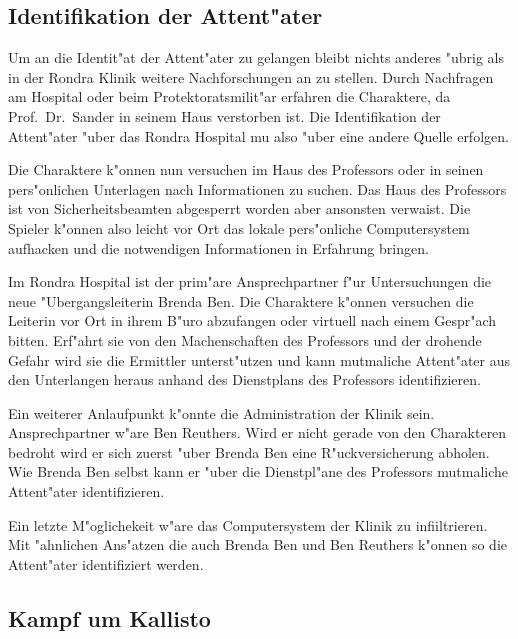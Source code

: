 \subsection{Identifikation der Attent"ater}

 Um an die Identit"at der Attent"ater zu gelangen bleibt nichts anderes "ubrig als in der Rondra Klinik weitere Nachforschungen an zu stellen. Durch Nachfragen am Hospital oder beim Protektoratsmilit"ar erfahren die Charaktere, da\3 Prof.~Dr.~Sander in seinem Haus verstorben ist. Die Identifikation der Attent"ater "uber das Rondra Hospital mu\3 also "uber eine andere Quelle erfolgen.

 Die Charaktere k"onnen nun versuchen im Haus des Professors oder in seinen pers"onlichen Unterlagen nach Informationen zu suchen. Das Haus des Professors ist von Sicherheitsbeamten abgesperrt worden aber ansonsten verwaist. Die Spieler k"onnen also leicht vor Ort das lokale pers"onliche Computersystem aufhacken und die notwendigen Informationen in Erfahrung bringen.

 Im Rondra Hospital ist der prim"are Ansprechpartner f"ur Untersuchungen die neue "Ubergangsleiterin Brenda Ben. Die Charaktere k"onnen versuchen die Leiterin vor Ort in ihrem B"uro abzufangen oder virtuell nach einem Gespr"ach bitten. Erf"ahrt sie von den Machenschaften des Professors und der drohende Gefahr wird sie die Ermittler unterst"utzen und kann mutma\3liche Attent"ater aus den Unterlangen heraus anhand des Dienstplans des Professors identifizieren.

 Ein weiterer Anlaufpunkt k"onnte die Administration der Klinik sein. Ansprechpartner w"are Ben Reuthers. Wird er nicht gerade von den Charakteren bedroht wird er sich zuerst "uber Brenda Ben eine R"uckversicherung abholen. Wie Brenda Ben selbst kann er "uber die Dienstpl"ane des Professors mutma\3liche Attent"ater identifizieren.

 Ein letzte M"oglichekeit w"are das Computersystem der Klinik zu infiiltrieren. Mit "ahnlichen Ans"atzen die auch Brenda Ben und Ben Reuthers k"onnen so die Attent"ater identifiziert werden.


\subsection{Kampf um Kallisto}

